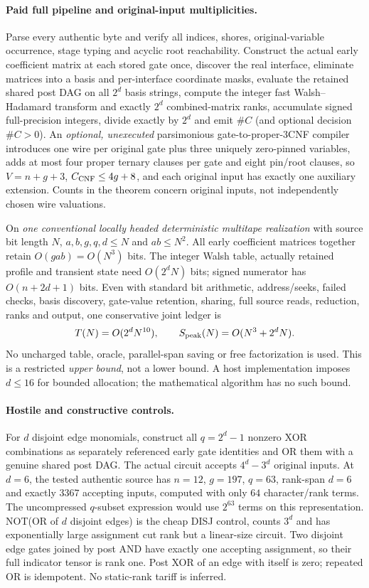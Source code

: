 \documentclass[11pt]{article}
\begin{document}
\paragraph{Paid full pipeline and original-input multiplicities.}
Parse every authentic byte and verify all indices, shores, original-variable occurrence, stage typing and acyclic root reachability. Construct the actual early coefficient matrix at each stored gate once, discover the real interface, eliminate matrices into a basis and per-interface coordinate masks, evaluate the retained shared post DAG on all $2^d$ basis strings, compute the integer fast Walsh--Hadamard transform and exactly $2^d$ combined-matrix ranks, accumulate signed full-precision integers, divide exactly by $2^d$ and emit $\#C$ (and optional decision $\#C>0$). An \emph{optional, unexecuted} parsimonious gate-to-proper-3CNF compiler introduces one wire per original gate plus three uniquely zero-pinned variables, adds at most four proper ternary clauses per gate and eight pin/root clauses, so $V=n+g+3$, $C_{\rm CNF}\le4g+8$, and each original input has exactly one auxiliary extension. Counts in the theorem concern original inputs, not independently chosen wire valuations.

On \emph{one conventional locally headed deterministic multitape realization} with source bit length $N$, $a,b,g,q,d\le N$ and $ab\le N^2$. All early coefficient matrices together retain $O(gab)=O(N^3)$ bits. The integer Walsh table, actually retained profile and transient state need $O(2^dN)$ bits; signed numerator has $O(n+2d+1)$ bits. Even with standard bit arithmetic, address/seeks, failed checks, basis discovery, gate-value retention, sharing, full source reads, reduction, ranks and output, one conservative joint ledger is
\[
T(N)=O(2^dN^{10}),\qquad S_{\rm peak}(N)=O(N^3+2^dN).
\]
No uncharged table, oracle, parallel-span saving or free factorization is used. This is a restricted \emph{upper bound}, not a lower bound. A host implementation imposes $d\le16$ for bounded allocation; the mathematical algorithm has no such bound.

\paragraph{Hostile and constructive controls.}
For $d$ disjoint edge monomials, construct all $q=2^d-1$ nonzero XOR combinations as separately referenced early gate identities and OR them with a genuine shared post DAG. The actual circuit accepts $4^d-3^d$ original inputs. At $d=6$, the tested authentic source has $n=12$, $g=197$, $q=63$, rank-span $d=6$ and exactly $3367$ accepting inputs, computed with only $64$ character/rank terms. The uncompressed $q$-subset expression would use $2^{63}$ terms on this representation. NOT(OR of $d$ disjoint edges) is the cheap DISJ control, counts $3^d$ and has exponentially large assignment cut rank but a linear-size circuit. Two disjoint edge gates joined by post AND have exactly one accepting assignment, so their full indicator tensor is rank one. Post XOR of an edge with itself is zero; repeated OR is idempotent. No static-rank tariff is inferred.
\end{document}

